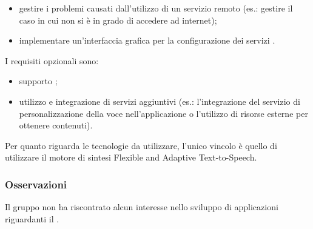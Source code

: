 \begin{itemize}
	\item gestire i problemi causati dall'utilizzo di un servizio remoto (es.: gestire il caso in cui non si è in grado di accedere ad internet);
	\item implementare un'interfaccia grafica per la configurazione dei servizi .
\end{itemize}

I requisiti opzionali sono:

\begin{itemize}
	\item supporto ;
	\item utilizzo e integrazione di servizi aggiuntivi (es.: l'integrazione del servizio di personalizzazione
	della voce nell'applicazione o l'utilizzo di risorse esterne per ottenere contenuti).
\end{itemize}

Per quanto riguarda le tecnologie da utilizzare, l'unico vincolo è quello di utilizzare il motore di sintesi Flexible and Adaptive Text-to-Speech.

\subsubsection{Osservazioni}
Il gruppo non ha riscontrato alcun interesse nello sviluppo di applicazioni riguardanti il .

